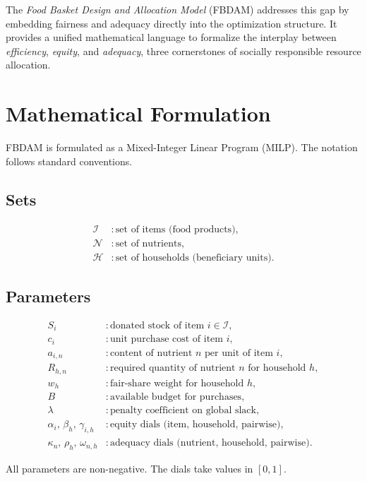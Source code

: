 \documentclass[preprint,12pt]{elsarticle}
\begin{document}
The \emph{Food Basket Design and Allocation Model} (FBDAM) addresses this gap by embedding fairness and adequacy directly into the optimization structure. It provides a unified mathematical language to formalize the interplay between \emph{efficiency}, \emph{equity}, and \emph{adequacy}, three cornerstones of socially responsible resource allocation.

\section{Mathematical Formulation}
\label{sec:model}
FBDAM is formulated as a Mixed-Integer Linear Program (MILP). The notation follows standard conventions.

\subsection{Sets}
\begin{align*}
\mathcal{I} &: \text{set of items (food products)},\\
\mathcal{N} &: \text{set of nutrients},\\
\mathcal{H} &: \text{set of households (beneficiary units)}.
\end{align*}

\subsection{Parameters}
\begin{align*}
S_i & : \text{donated stock of item } i \in \mathcal{I},\\
c_i & : \text{unit purchase cost of item } i,\\
a_{i,n} & : \text{content of nutrient } n \text{ per unit of item } i,\\
R_{h,n} & : \text{required quantity of nutrient } n \text{ for household } h,\\
w_h & : \text{fair-share weight for household } h,\\
B & : \text{available budget for purchases},\\
\lambda & : \text{penalty coefficient on global slack},\\
\alpha_i,\, \beta_h,\, \gamma_{i,h} & : \text{equity dials (item, household, pairwise)},\\
\kappa_n,\, \rho_h, \, \omega_{n,h} & : \text{adequacy dials (nutrient, household, pairwise)}.
\end{align*}

All parameters are non-negative. The dials take values in $[0,1]$.
\end{document}
